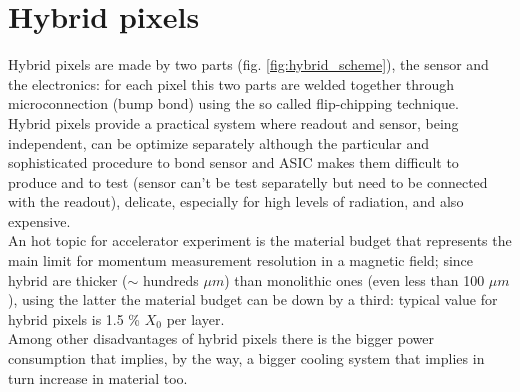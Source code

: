 \section{Hybrid pixels}
   Hybrid pixels are made by two parts (fig. \ref{fig:hybrid_scheme}), the sensor and the electronics: for each pixel this two parts are welded together through microconnection (bump bond) using the so called flip-chipping technique.\\  
   Hybrid pixels provide a practical system where readout and sensor, being independent, can be optimize separately although the particular and sophisticated procedure to bond sensor and ASIC makes them difficult to produce and to test (sensor can't be test separatelly but need to be connected with the readout), delicate, especially for high levels of radiation, and also expensive. \\
   An hot topic for accelerator experiment is the material budget that represents the main limit for momentum measurement resolution in a magnetic field; since hybrid are thicker ($\sim$ hundreds $\mu m$) than monolithic ones (even less than 100 $\mu m$), using the latter the material budget can be down by a third: typical value for hybrid pixels is 1.5 \% $X_0$ per layer.\\
   Among other disadvantages of hybrid pixels there is the bigger power consumption that implies, by the way, a bigger cooling system that implies in turn increase in material too.


